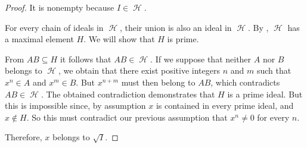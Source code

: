 \begin{proof}
  It is nonempty because \( I \in \mscrH \).

  For every chain of ideals in \( \mscrH \), their union is also an ideal in \( \mscrH \). By , \( \mscrH \) has a maximal element \( H \). We will show that \( H \) is prime.

  From \( AB \subseteq H \) it follows that \( AB \in \mscrH \). If we suppose that neither \( A \) nor \( B \) belongs to \( \mscrH \), we obtain that there exist positive integers \( n \) and \( m \) such that \( x^n \in A \) and \( x^m \in B \). But \( x^{n + m} \) must then belong to \( AB \), which contradicts \( AB \in \mscrH \). The obtained contradiction demonstrates that \( H \) is a prime ideal. But this is impossible since, by assumption \( x \) is contained in every prime ideal, and \( x \not\in H \). So this must contradict our previous assumption that \( x^n \neq 0 \) for every \( n \).

  Therefore, \( x \) belongs to \( \sqrt I \).
\end{proof}

